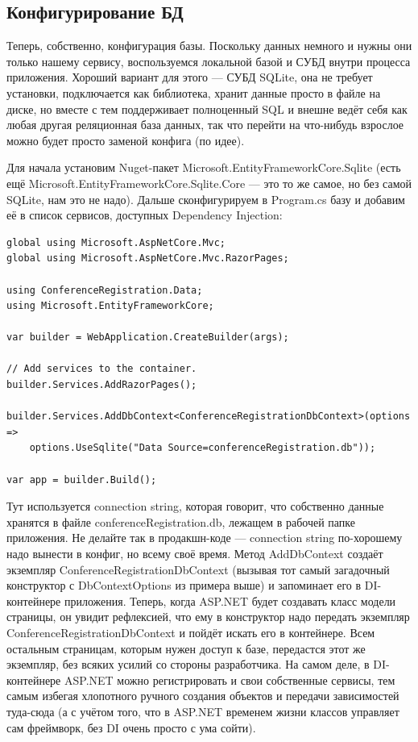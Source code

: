 \documentclass{../../text-style}
\begin{document}
\subsection{Конфигурирование БД}

Теперь, собственно, конфигурация базы. Поскольку данных немного и нужны они только нашему сервису, воспользуемся локальной базой и СУБД внутри процесса приложения. Хороший вариант для этого --- СУБД SQLite, она не требует установки, подключается как библиотека, хранит данные просто в файле на диске, но вместе с тем поддерживает полноценный SQL и внешне ведёт себя как любая другая реляционная база данных, так что перейти на что-нибудь взрослое можно будет просто заменой конфига (по идее).

Для начала установим Nuget-пакет Microsoft.EntityFrameworkCore.Sqlite (есть ещё Microsoft.EntityFrameworkCore.Sqlite.Core --- это то же самое, но без самой SQLite, нам это не надо). Дальше сконфигурируем в Program.cs базу и добавим её в список сервисов, доступных Dependency Injection:

\begin{verbatim}
global using Microsoft.AspNetCore.Mvc;
global using Microsoft.AspNetCore.Mvc.RazorPages;

using ConferenceRegistration.Data;
using Microsoft.EntityFrameworkCore;

var builder = WebApplication.CreateBuilder(args);

// Add services to the container.
builder.Services.AddRazorPages();

builder.Services.AddDbContext<ConferenceRegistrationDbContext>(options =>
    options.UseSqlite("Data Source=conferenceRegistration.db"));

var app = builder.Build();
\end{verbatim}

Тут используется connection string, которая говорит, что собственно данные хранятся в файле conferenceRegistration.db, лежащем в рабочей папке приложения. Не делайте так в продакшн-коде --- connection string по-хорошему надо вынести в конфиг, но всему своё время. Метод AddDbContext создаёт экземпляр ConferenceRegistrationDbContext (вызывая тот самый загадочный конструктор с DbContextOptions из примера выше) и запоминает его в DI-контейнере приложения. Теперь, когда ASP.NET будет создавать класс модели страницы, он увидит рефлексией, что ему в конструктор надо передать экземпляр ConferenceRegistrationDbContext и пойдёт искать его в контейнере. Всем остальным страницам, которым нужен доступ к базе, передастся этот же экземпляр, без всяких усилий со стороны разработчика. На самом деле, в DI-контейнере ASP.NET можно регистрировать и свои собственные сервисы, тем самым избегая хлопотного ручного создания объектов и передачи зависимостей туда-сюда (а с учётом того, что в ASP.NET временем жизни классов управляет сам фреймворк, без DI очень просто с ума сойти).
\end{document}
